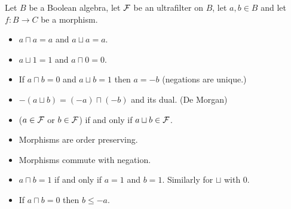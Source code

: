 \begin{lem}
    Let $B$ be a Boolean algebra, let $\mathcal{F}$ be an ultrafilter
    on $B$, let $a,b \in B$ and let $f : B \to C$ be a morphism.
    \begin{itemize}
        \item $a \sqcap a = a$ and $a \sqcup a = a$.
        \item $a \sqcup 1 = 1$ and $a \sqcap 0 = 0$.
        \item If $a \sqcap b = 0$ and $a \sqcup b = 1$ then $a = - b$
            (negations are unique.)
        \item $- (a \sqcup b) = (- a) \sqcap (- b)$ and its dual. 
            (De Morgan)
        \item ($a \in \mathcal{F}$ or $b \in \mathcal{F}$) if and only if $a \sqcup b \in \mathcal{F}$.
        \item Morphisms are order preserving.
        \item Morphisms commute with negation.
        \item $a \sqcap b = 1$ if and only if $a = 1$ and $b = 1$.
            Similarly for $\sqcup$ with $0$.
        \item If $a \sqcap b = 0$ then $b \leq - a$.
    \end{itemize}
\end{lem}
